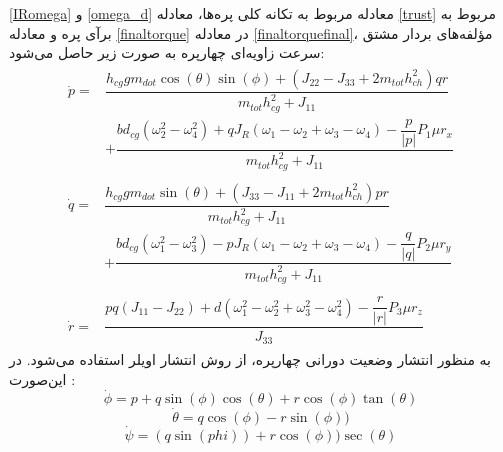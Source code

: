  \ref{IRomega} و
 \ref{omega_d}
 معادله مربوط به تکانه کلی پره‌ها، 
 معادله \ref{trust}
مربوط به برآی پره و معادله 
\ref{finaltorque}
در معادله 
\ref{finaltorquefinal}،
مؤلفه‌های بردار مشتق سرعت زاویه‌ای چهارپره به صورت زیر حاصل می‌شود:
\begin{align}
	\begin{split}\label{p dot}
		\dot{p} =& \dfrac{h_{cg}gm_{dot}\cos(\theta)\sin(\phi)
			+\left(J_{22} - J_{33} +2m_{tot}h_{ch}^2\right)qr
		}
		{m_{tot}h_{cg}^2 + J_{11}} \\
		&+\dfrac{bd_{cg}\left(\omega_2^2-\omega_4^2\right) + qJ_R(\omega_1-\omega_2+\omega_3-\omega_4) - \dfrac{p}{\lvert p \rvert}P_1\mu r_x}
		{m_{tot}h_{cg}^2 + J_{11}}
	\end{split}\\[1em]
		\begin{split}
		\dot{q} =& \dfrac{h_{cg}gm_{dot}\sin(\theta)
			+\left(J_{33} - J_{11} +2m_{tot}h_{ch}^2\right)pr
		}
		{m_{tot}h_{cg}^2 + J_{11}} \\
		&+\dfrac{bd_{cg}\left(\omega_1^2-\omega_3^2\right) - pJ_R(\omega_1-\omega_2+\omega_3-\omega_4)- \dfrac{q}{\lvert q \rvert}P_2\mu r_y}
		{m_{tot}h_{cg}^2 + J_{11}}
	\end{split}\\[1em]
	\begin{split}
		\dot{r} =& \dfrac{pq(J_{11}-J_{22})
		+ d(\omega_1^2-\omega_2^2+\omega_3^2-\omega_4^2) - \dfrac{r}{\lvert r \rvert}P_3\mu r_z
	}{J_{33}}
	\end{split}
\end{align}
به منظور انتشار وضعیت دورانی چهارپره، از روش انتشار اویلر استفاده می‌شود. در این‌صورت
\cite{zipfel2000modeling}
:
\begin{equation}
	\dot\phi = p + q\sin(\phi)\cos(\theta) +‌
	r\cos(\phi)\tan(\theta)
\end{equation}
\begin{equation}
\dot \theta = q\cos(\phi) - r\sin(\phi))
\end{equation}
\begin{equation}\label{psidot}
	\dot\psi = (q\sin(phi)) + r\cos(\phi))\sec(\theta) 
\end{equation}


